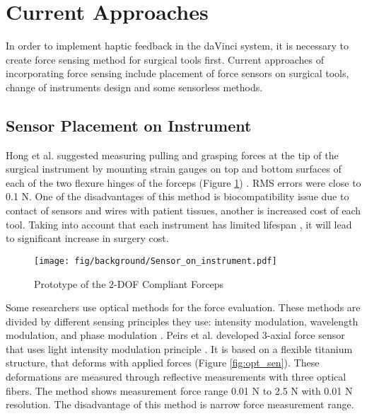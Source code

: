 \section{Current Approaches}
\label{sec:CurAppr}

In order to implement haptic feedback in the daVinci system, it is necessary to create force sensing method for surgical tools first. Current approaches of incorporating force sensing include placement of force sensors on surgical tools, change of instruments design and some sensorless methods.

\subsection{Sensor Placement on Instrument}

Hong et al. suggested measuring pulling and grasping forces at the tip of the surgical instrument by mounting strain gauges on top and bottom surfaces of each of the two flexure hinges of the forceps (Figure \ref{fig:integr_sen}) \cite{hong_design_2012}. RMS errors were close to 0.1 N. One of the disadvantages of this method is biocompatibility issue due to contact of sensors and wires with patient tissues, another is increased cost of each tool. Taking into account that each instrument has limited lifespan \cite{ho_health_2011}, it will lead to significant increase in surgery cost.

\begin{figure}[h]
	\begin{center}
	\texttt{[image: fig/background/Sensor\_on\_instrument.pdf]}
	\end{center}
	\vspace{-4mm}
	\caption[Prototype of the 2-DOF Compliant Forceps]
	{Prototype of the 2-DOF Compliant Forceps \cite{hong_design_2012}}
	\label{fig:integr_sen}
	\vspace{-2mm}
\end{figure}

Some researchers use optical methods for the force evaluation. These methods are divided by different sensing principles they use: intensity modulation, wavelength modulation, and phase modulation \cite{su_fiber_optic_2017}. Peirs et al. developed 3-axial force sensor that uses light intensity modulation principle \cite{_micro_2004}. It is based on a flexible titanium structure, that deforms with applied forces (Figure \ref{fig:opt_sen}). These deformations are measured through reflective measurements with three optical fibers. The method shows measurement force range 0.01 N to 2.5 N with 0.01 N resolution. The disadvantage of this method is narrow force measurement range.

